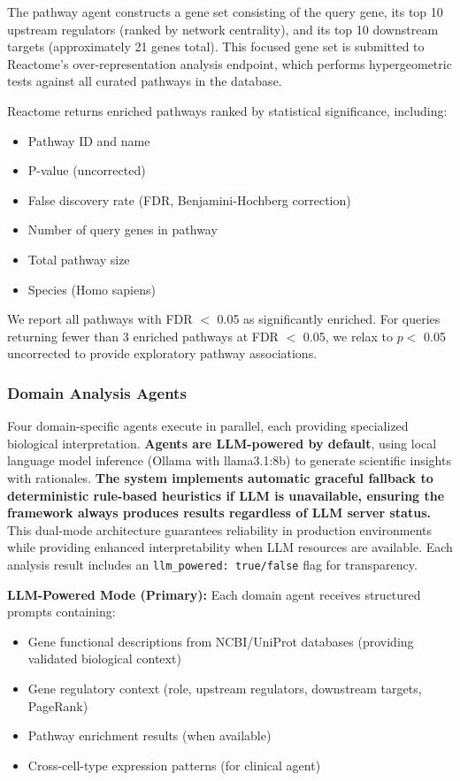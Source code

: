 \documentclass[11pt]{article}
\begin{document}
The pathway agent constructs a gene set consisting of the query gene, its top 10 upstream regulators (ranked by network centrality), and its top 10 downstream targets (approximately 21 genes total). This focused gene set is submitted to Reactome's over-representation analysis endpoint, which performs hypergeometric tests against all curated pathways in the database.

Reactome returns enriched pathways ranked by statistical significance, including:
\begin{itemize}
\item Pathway ID and name
\item P-value (uncorrected)
\item False discovery rate (FDR, Benjamini-Hochberg correction)
\item Number of query genes in pathway
\item Total pathway size
\item Species (Homo sapiens)
\end{itemize}

We report all pathways with FDR $<$ 0.05 as significantly enriched. For queries returning fewer than 3 enriched pathways at FDR $<$ 0.05, we relax to $p <$ 0.05 uncorrected to provide exploratory pathway associations.

\subsubsection{Domain Analysis Agents}

Four domain-specific agents execute in parallel, each providing specialized biological interpretation. \textbf{Agents are LLM-powered by default}, using local language model inference (Ollama with llama3.1:8b) to generate scientific insights with rationales. \textbf{The system implements automatic graceful fallback to deterministic rule-based heuristics if LLM is unavailable, ensuring the framework always produces results regardless of LLM server status.} This dual-mode architecture guarantees reliability in production environments while providing enhanced interpretability when LLM resources are available. Each analysis result includes an \texttt{llm\_powered: true/false} flag for transparency.

\textbf{LLM-Powered Mode (Primary):}
Each domain agent receives structured prompts containing:
\begin{itemize}
\item Gene functional descriptions from NCBI/UniProt databases (providing validated biological context)
\item Gene regulatory context (role, upstream regulators, downstream targets, PageRank)
\item Pathway enrichment results (when available)
\item Cross-cell-type expression patterns (for clinical agent)
\end{itemize}
\end{document}
